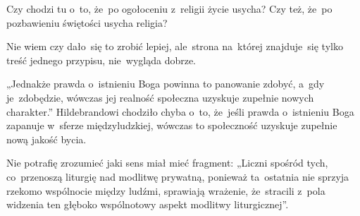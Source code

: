 \documentclass[a4paper,11pt]{article}
\begin{document}
\vspace{\spaceTwo}










\start {} Czy chodzi tu o~to, że~po ogołoceniu z~religii
życie usycha? Czy też, że~po pozbawieniu świętości usycha religia?

\vspace{\spaceFour}


\start {} Nie wiem czy dało~się to zrobić lepiej, ale~strona
na~której znajduje~się tylko treść jednego przypisu, nie~wygląda
dobrze.

\vspace{\spaceFour}


\start {} „Jednakże prawda o~istnieniu Boga powinna to
panowanie zdobyć, a~gdy je~zdobędzie, wówczas jej realność społeczna
uzyskuje zupełnie nowych charakter.” Hildebrandowi chodziło chyba
o~to, że~jeśli prawda o~istnieniu Boga zapanuje w~sferze
międzyludzkiej, wówczas to społeczność uzyskuje zupełnie nową jakość
bycia.

\vspace{\spaceFour}


\start {} Nie potrafię zrozumieć jaki sens miał mieć fragment:
„Liczni spośród tych, co~przenoszą liturgię nad modlitwę prywatną,
ponieważ ta~ostatnia nie sprzyja rzekomo wspólnocie między ludźmi,
sprawiają wrażenie, że~stracili z~pola widzenia ten głęboko
wspólnotowy aspekt modlitwy liturgicznej”.
\end{document}
